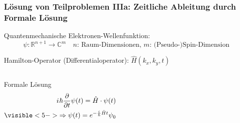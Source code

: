 \documentclass{beamer}
\newcommand{\iu}{{i\mkern1mu}} 	%
\begin{document}
\begin{frame}[t] %
  \frametitle{Lösung von Teilproblemen IIIa: Zeitliche Ableitung durch Formale Lösung}
 Quantenmechanische Elektronen-Wellenfunktion: \begin{equation*}\psi: \mathbb{R}^{n+1} \rightarrow \mathbb{C}^m \quad \text{$n$: Raum-Dimensionen, $m$: (Pseudo-)Spin-Dimension}\end{equation*}

 Hamilton-Operator (Differentialoperator): $\hat{H}(k_x, k_y, t)$

 \begin{columns}
 \begin{block}{Formale Lösung}
  \begin{align*}
    \iu \hbar \frac{\partial}{\partial t}  \psi(t) = \hat{H} \cdot \psi(t)  \\
    \visible<5->{\Rightarrow  \psi(t) = e^{-\frac{\iu}{\hbar}\hat{H}t} \psi_0}
  \end{align*}
    \end{block}
    
     
  \end{columns}
\end{frame}
\end{document}

